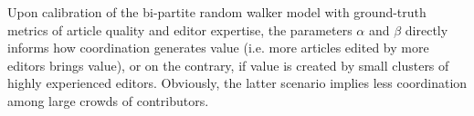 Upon calibration of the bi-partite random walker model with ground-truth metrics of article quality and editor expertise, the parameters $\alpha$ and $\beta$  directly informs how coordination generates value (i.e. more articles edited by more editors brings value), or on the contrary, if value is created by small clusters of highly experienced editors. Obviously, the latter scenario implies less coordination among large crowds of contributors.





%
%
%
%

